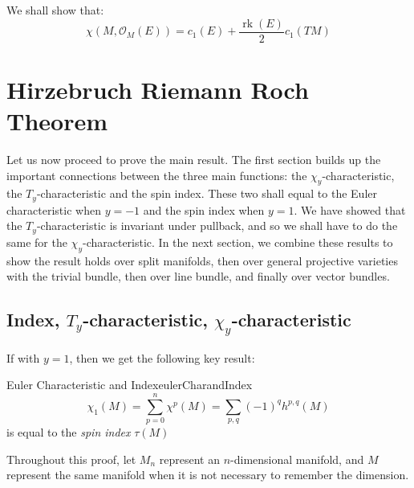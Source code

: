 \documentclass{book}
\newcommand{\CO}{{\mathcal{O}}}
\newcommand{\rk}{{\operatorname{rk}}}
\begin{document}
We shall show that:
\[
    \chi(M, \CO_M(E)) = c_1(E) + \frac{\rk(E)}{2}c_1(TM)
\]

\section{Hirzebruch Riemann Roch Theorem}\label{sec:HRR}

Let us now proceed to prove the main result. The first section builds up the important connections between the
three main functions: the $\chi_y$-characteristic, the $T_y$-characteristic and the spin index. These two
shall equal to the Euler characteristic when $y=-1$ and the spin index when $y=1$. We have showed that the
$T_y$-characteristic is invariant under pullback, and so we shall have to do the same for the
$\chi_y$-characteristic. In the next section, we combine these results to show the result holds over split
manifolds, then over general projective varieties with the trivial bundle, then over line bundle, and finally
over vector bundles.

\subsection{Index, $T_y$-characteristic, $\chi_y$-characteristic}

If with $y = 1$, then we get the following key result:
\begin{thm}{Euler Characteristic and Index}{eulerCharandIndex}
  \[
  \chi_1(M) = \sum_{p=0}^n \chi^p(M) = \sum_{p,q}(-1)^qh^{p,q}(M)
\]
is equal to the \emph{spin index} $\tau(M)$%
\end{thm}

Throughout this proof, let $M_n$ represent an $n$-dimensional manifold, and $M$ represent the same manifold
when it is not necessary to remember the dimension.
\end{document}
